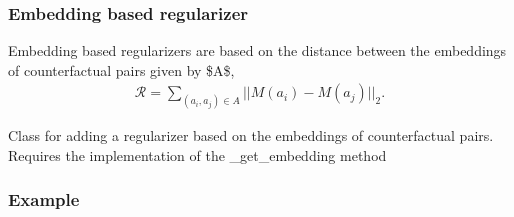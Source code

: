 \documentclass[letterpaper,10pt,english]{sphinxmanual}
\begin{document}
\subsubsection{Embedding based regularizer}
\label{\detokenize{algorithms_inprocessors:embedding-based-regularizer}}\label{\detokenize{algorithms_inprocessors:embreg}}
\sphinxAtStartPar
Embedding based regularizers  are based on the distance between the embeddings of counterfactual pairs given by \$A\$,
\begin{equation*}
\begin{split}\mathcal{R} = \sum_{(a_i, a_j)\in A} || M(a_i) - M(a_j)||_2 .\end{split}
\end{equation*}

\begin{fulllineitems}

\pysigstartsignatures
\pysiglinewithargsret
{}
{\sphinxparamcomma {}}
{}
\pysigstopsignatures
\sphinxAtStartPar
Class for adding a regularizer based on the embeddings of counterfactual pairs.
Requires the implementation of the \_get\_embedding method
\subsubsection*{Example}


\end{fulllineitems}
\end{document}
